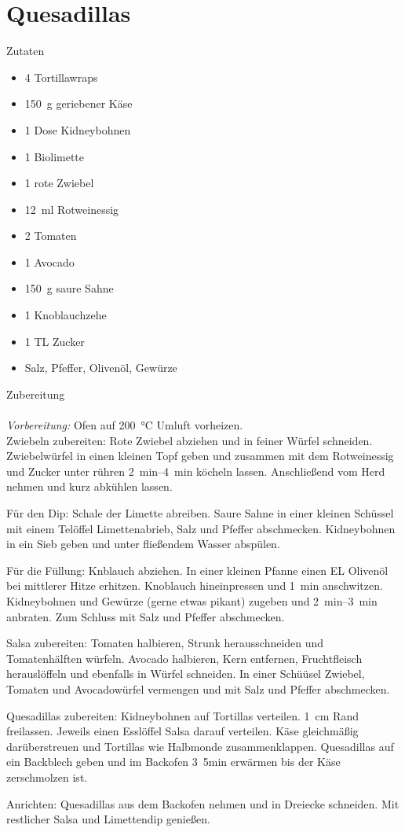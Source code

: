\section*{Quesadillas}
\ihead{}\ohead{}
\cfoot{}
{\Large Zutaten}
\begin{multicols}{2}
\begin{itemize}
    \item \num{4} Tortillawraps
    \item \SI{150}{g} geriebener Käse
    \item \num{1} Dose Kidneybohnen
    \item \num{1} Biolimette
    \item \num{1} rote Zwiebel
    \item \SI{12}{ml} Rotweinessig
    \item \num{2} Tomaten
    \item \num{1} Avocado
    \item \SI{150}{g} saure Sahne
    \item \num{1} Knoblauchzehe
    \item \num{1} TL Zucker
    \item Salz, Pfeffer, Olivenöl, Gewürze
\end{itemize}
\end{multicols}
\noindent
{\Large Zubereitung}\\
\\
\textit{Vorbereitung:} Ofen auf \SI{200}{\celsius} Umluft vorheizen.\\
Zwiebeln zubereiten: Rote Zwiebel abziehen und in feiner Würfel schneiden.
Zwiebelwürfel in einen kleinen Topf geben und zusammen mit dem Rotweinessig und Zucker unter rühren \SIrange{2}{4}{min} köcheln lassen.
Anschließend vom Herd nehmen und kurz abkühlen lassen.

Für den Dip: Schale der Limette abreiben. 
Saure Sahne in einer kleinen Schüssel mit einem Telöffel Limettenabrieb, Salz und Pfeffer abschmecken.
Kidneybohnen in ein Sieb geben und unter fließendem Wasser abspülen.

Für die Füllung: Knblauch abziehen. 
In einer kleinen Pfanne einen EL Olivenöl bei mittlerer Hitze erhitzen. 
Knoblauch hineinpressen und \SI{1}{min} anschwitzen. 
Kidneybohnen und Gewürze (gerne etwas pikant) zugeben und \SIrange{2}{3}{min} anbraten. 
Zum Schluss mit Salz und Pfeffer abschmecken.

Salsa zubereiten: Tomaten halbieren, Strunk herausschneiden und Tomatenhälften würfeln. 
Avocado halbieren, Kern entfernen, Fruchtfleisch herauslöffeln und ebenfalls in Würfel schneiden. 
In einer Schüüsel Zwiebel, Tomaten und Avocadowürfel vermengen und mit Salz und Pfeffer abschmecken.

Quesadillas zubereiten: Kidneybohnen auf Tortillas verteilen.
\SI{1}{cm} Rand freilassen.
Jeweils einen Esslöffel Salsa darauf verteilen. 
Käse gleichmäßig darüberstreuen und Tortillas wie Halbmonde zusammenklappen.
Quesadillas auf ein Backblech geben und im Backofen \SI{3}{5}{min} erwärmen bis der Käse zerschmolzen ist. 

Anrichten: Quesadillas aus dem Backofen nehmen und in Dreiecke schneiden. 
Mit restlicher Salsa und Limettendip genießen. 

